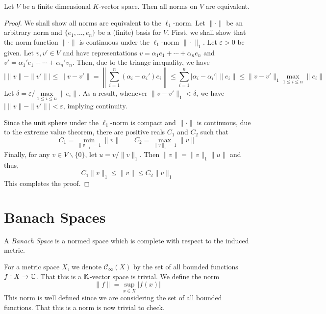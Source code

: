 \begin{theorem}
    Let $V$ be a finite dimensional $K$-vector space. Then all norms on $V$ are equivalent.
\end{theorem}
\begin{proof}
    We shall show all norms are equivalent to the $\ell_1$-norm. Let $\|\cdot\|$ be an arbitrary norm and $\{e_1,\ldots,e_n\}$ be a (finite) basis for $V$. First, we shall show that the norm function $\|\cdot\|$ is continuous under the $\ell_1$-norm $\|\cdot\|_1$. Let $\varepsilon > 0$ be given. Let $v,v'\in V$ and have representations $v = \alpha_1e_1 + \cdots + \alpha_ne_n$ and $v' = \alpha_1'e_1 + \cdots + \alpha_n'v_n$. Then, due to the triange inequality, we have 
    \begin{equation*}
        |\|v\| - \|v'\||\le\|v-v'\| = \left\|\sum_{i = 1}^n(\alpha_i - \alpha_i')e_i\right\|\le\sum_{i = 1}^n|\alpha_i - \alpha_i'|\|e_i\|\le\|v - v'\|_1\max_{1\le i\le n}\|e_i\|
    \end{equation*}
    Let $\delta = \varepsilon/\max\limits_{1\le i\le n}\|e_i\|$. As a result, whenever $\|v - v'\|_1 < \delta$, we have $|\|v\| - \|v'\|| < \varepsilon$, implying continuity.

    Since the unit sphere under the $\ell_1$-norm is compact and $\|\cdot\|$ is continuous, due to the extreme value theorem, there are positive reals $C_1$ and $C_2$ such that 
    \begin{equation*}
        C_1 = \min_{\|v\|_1 = 1}\|v\|\qquad C_2 = \max_{\|v\|_1 = 1}\|v\|
    \end{equation*}
    Finally, for any $v\in V\backslash\{0\}$, let $u = v/\|v\|_1$. Then $\|v\| = \|v\|_1\|u\|$ and thus, 
    \begin{equation*}
        C_1\|v\|_1\le\|v\|\le C_2\|v\|_1
    \end{equation*}
    This completes the proof.
\end{proof}

\section{Banach Spaces}
\begin{definition}
    A \textit{Banach Space} is a normed space which is complete with respect to the induced metric.
\end{definition}

For a metric space $X$, we denote $\mathcal C_\infty(X)$ by the set of all bounded functions $f: X\to\mathbb{C}$. That this is a $\mathbb K$-vector space is trivial. We define the norm 
\begin{equation*}
    \|f\| = \sup_{x\in X} |f(x)|
\end{equation*}
This norm is well defined since we are considering the set of all bounded functions. That this is a norm is now trivial to check.

